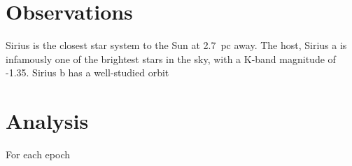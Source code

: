 \documentclass[twocolumn]{aastex631}
\begin{document}
\section{Observations}

Sirius is the closest star system to the Sun at \SI{2.7}{pc} away. The host, Sirius a is infamously one of the brightest stars in the sky, with a K-band magnitude of -1.35. Sirius b has a well-studied orbit

\section{Analysis}

For each epoch




{}

\end{document}
